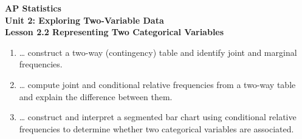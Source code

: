 \documentclass[10pt]{article}
\begin{document}
\vspace{-0.8in}

\begin{center}
  {\color{white}\textbf{\LARGE AP Statistics}}\\[4pt]
  {\color{skymid}\large\textbf{Unit 2: Exploring Two-Variable Data}}\\[6pt]
  {\color{white}\textbf{\large Lesson 2.2 \quad Representing Two Categorical Variables}}
\end{center}

\vspace{0.22in}

\namedateperiod

\vspace{0.18in}

\begin{learningtargetbox}
\small
\begin{enumerate}[leftmargin=1.5em, itemsep=5pt]
  \item \ldots{} construct a two-way (contingency) table and identify joint and marginal
        frequencies.
  \item \ldots{} compute joint and conditional relative frequencies from a two-way table
        and explain the difference between them.
  \item \ldots{} construct and interpret a segmented bar chart using conditional relative
        frequencies to determine whether two categorical variables are associated.
\end{enumerate}
\end{learningtargetbox}

\vspace{0.14in}
\end{document}
